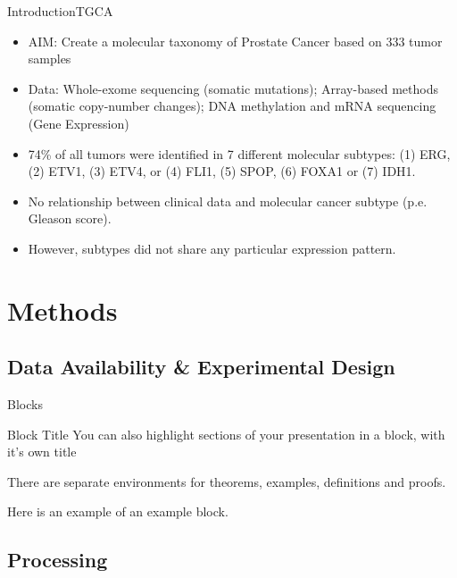 \documentclass{beamer}
\begin{document}
\begin{frame}{Introduction}{TGCA \cite{Abeshouse2015}}
  \begin{itemize}
  \item<1-> {
    AIM: Create a molecular taxonomy of Prostate Cancer based on 333 tumor samples
    \pause %
  }
  \item<2-> {   
	Data: Whole-exome sequencing (somatic mutations); Array-based methods (somatic copy-number changes); DNA 		methylation and mRNA sequencing (Gene Expression)  
  }
  \item<3-> {
    74\% of all tumors were identified in 7 different molecular subtypes: (1) ERG, (2) ETV1, (3) ETV4, or (4) FLI1, (5) SPOP, (6) FOXA1 or (7) IDH1.
  }
  \item<4-> {
  	No relationship between clinical data and molecular cancer subtype (p.e. Gleason score).
  }
  \item<5->{
  	However, subtypes did not share any particular expression pattern. 
  }
  \end{itemize}
\end{frame}

\section{Methods}

\subsection{Data Availability \& Experimental Design}

\begin{frame}{Blocks}
\begin{block}{Block Title}
You can also highlight sections of your presentation in a block, with it's own title
\end{block}
\begin{theorem}
There are separate environments for theorems, examples, definitions and proofs.
\end{theorem}
\begin{example}
Here is an example of an example block.
\end{example}
\end{frame}

\subsection{Processing}
\end{document}
